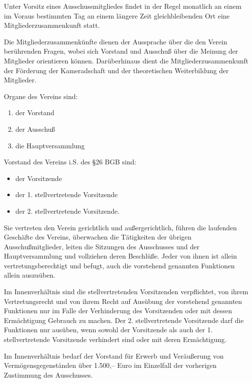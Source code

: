 \documentclass[10pt,a4paper,parskip=half]{scrartcl}
\begin{document}
\begin{contract}
\begin{multicols}{2}
    Unter Vorsitz eines Ausschussmitgliedes findet in der Regel monatlich an einem im Voraus bestimmten Tag an einem längere Zeit gleichbleibenden Ort eine Mitgliederzusammenkunft statt.
    
    Die Mitgliederzusammenkünfte dienen der Aussprache über die den Verein berührenden Fragen,
    wobei sich Vorstand und Ausschuß über die Meinung der Mitglieder orientieren können.
    Darüberhinaus dient die Mitgliederzusammenkunft der Förderung der Kameradschaft und der theoretischen Weiterbildung der Mitglieder.
    
    Organe des Vereins sind:
    \begin{enumerate}[noitemsep]
      \item der Vorstand
      \item der Ausschuß
      \item die Hauptversammlung
    \end{enumerate}
    
    Vorstand des Vereins i.S. des §26 BGB sind:
    \begin{itemize}[noitemsep]
      \item der Vorsitzende
      \item der 1. stellvertretende Vorsitzende
      \item der 2. stellvertretende Vorsitzende.
    \end{itemize}
    Sie vertreten den Verein gerichtlich und außergerichtlich,
    führen die laufenden Geschäfte des Vereins,
    überwachen die Tätigkeiten der übrigen Ausschußmitglieder,
    leiten die Sitzungen des Ausschusses und der Hauptversammlung und vollziehen deren Beschlüße.
    Jeder von ihnen ist allein vertretungsberechtigt und befugt,
    auch die vorstehend genannten Funktionen allein auszuüben.
    
    Im Innenverhältnis sind die stellvertretenden Vorsitzenden verpflichtet,
    von ihrem Vertretungsrecht und von ihrem Recht auf Ausübung der vorstehend genannten Funktionen nur im Falle der Verhinderung des Vorsitzenden oder mit dessen Ermächtigung Gebrauch zu machen.
    Der 2. stellvertretende Vorsitzende darf die Funktionen nur ausüben,
    wenn sowohl der
    Vorsitzende als auch der 1. stellvertretende Vorsitzende verhindert sind oder mit deren Ermächtigung.
    
    Im Innenverhältnis bedarf der Vorstand für Erwerb und Veräußerung von Vermögensgegenständen über 1.500,-- Euro im Einzelfall der vorherigen Zustimmung des Ausschusses.
    

\end{multicols}
\end{contract}
\end{document}
